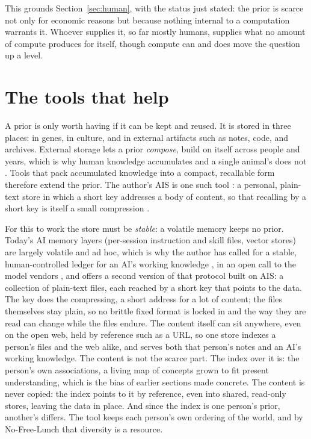 \documentclass[11pt]{article}
\begin{document}
This grounds Section~\ref{sec:human}, with the status just stated: the prior is scarce not only for
economic reasons but because nothing internal to a computation warrants it. Whoever supplies it, so
far mostly humans, supplies what no amount of compute produces for itself, though compute can and
does move the question up a level.

\section{The tools that help}
\label{sec:tools}
A prior is only worth having if it can be kept and reused. It is stored in three places: in genes, in
culture, and in external artifacts such as notes, code, and archives. External storage lets a prior
\emph{compose}, build on itself across people and years, which is why human knowledge accumulates and
a single animal's does not \cite{gavrilov_compressors}. Tools that pack accumulated knowledge into a
compact, recallable form therefore extend the prior. The author's AIS is one such tool \cite{gavrilov_ais}: a personal,
plain-text store in which a short key addresses a body of content, so that recalling by a short key
is itself a small compression \cite{gavrilov_atree}.

For this to work the store must be \emph{stable}: a volatile memory keeps no prior. Today's AI memory layers (per-session instruction
and skill files, vector stores) are largely volatile and ad hoc, which is why the author has called
for a stable, human-controlled ledger for an AI's working knowledge \cite{gavrilov_context_renorm}, in an open call to the model vendors \cite{gavrilov_context_call}, and offers a second version of that protocol built on AIS: a collection of
plain-text files, each reached by a short key that points to the data. The key does the compressing, a short address for a lot of content; the files
themselves stay plain, so no brittle fixed format is locked in and the way they are read can change
while the files endure. The content itself can sit anywhere, even on the open web, held by reference
such as a URL, so one store indexes a person's files and the web alike, and serves both that person's
notes and an AI's working knowledge. The content is not the scarce part. The index over it is: the
person's own associations, a living map of concepts grown to fit present understanding, which is the
bias of earlier sections made concrete. The content is never copied: the index points to it by
reference, even into shared, read-only stores, leaving the data in place. And since the index is one
person's prior, another's differs. The tool keeps each person's own ordering of the world, and by
No-Free-Lunch that diversity is a resource.
\end{document}

